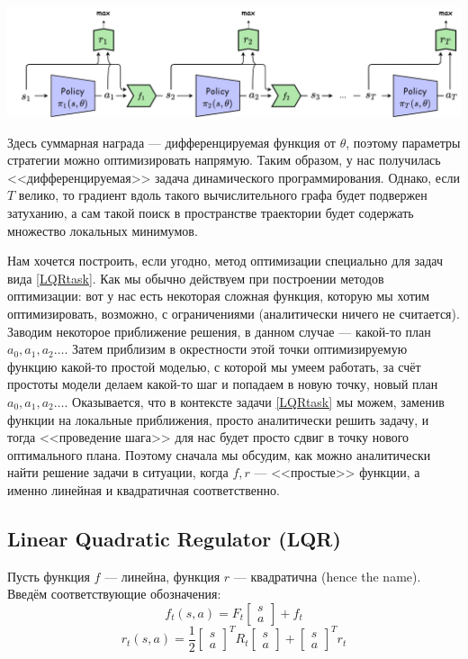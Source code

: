 \begin{center}
    \includegraphics[width=\textwidth]{Images/DDP.png}
\end{center}

Здесь суммарная награда --- дифференцируемая функция от $\theta$, поэтому параметры стратегии можно оптимизировать напрямую. Таким образом, у нас получилась <<дифференцируемая>> задача динамического программирования. Однако, если $T$ велико, то градиент вдоль такого вычислительного графа будет подвержен затуханию, а сам такой поиск в пространстве траектории будет содержать множество локальных минимумов.

Нам хочется построить, если угодно, метод оптимизации специально для задач вида \ref{LQRtask}. Как мы обычно действуем при построении методов оптимизации: вот у нас есть некоторая сложная функция, которую мы хотим оптимизировать, возможно, с ограничениями (аналитически ничего не считается). Заводим некоторое приближение решения, в данном случае --- какой-то план $a_0, a_1, a_2 \dots$. Затем приблизим в окрестности этой точки оптимизируемую функцию какой-то простой моделью, с которой мы умеем работать, за счёт простоты модели делаем какой-то шаг и попадаем в новую точку, новый план $a_0, a_1, a_2 \dots$. Оказывается, что в контексте задачи \ref{LQRtask} мы можем, заменив функции на локальные приближения, просто аналитически решить задачу, и тогда <<проведение шага>> для нас будет просто сдвиг в точку нового оптимального плана. Поэтому сначала мы обсудим, как можно аналитически найти решение задачи в ситуации, когда $f, r$ --- <<простые>> функции, а именно линейная и квадратичная соответственно. 

\subsection{Linear Quadratic Regulator (LQR)}

Пусть функция $f$ --- линейна, функция $r$ --- квадратична (hence the name). Введём соответствующие обозначения:
\begin{equation}\label{lineardynamics}
f_t(s, a) = F_t \begin{bmatrix} s \\ a \end{bmatrix} + f_t
\end{equation}
$$r_t(s, a) = \frac{1}{2} \begin{bmatrix} s \\ a \end{bmatrix}^T R_t \begin{bmatrix} s \\ a \end{bmatrix} + \begin{bmatrix} s \\ a \end{bmatrix}^T r_t$$

